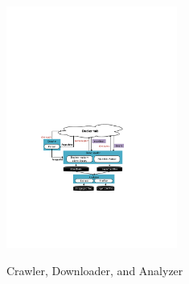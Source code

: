 
\begin{figure}
	\centering
	\includegraphics[width=0.5\textwidth]{graphs/fig-downloader-analyzer.pdf}\\
	\vspace{-6pt}
	\caption{Crawler, Downloader, and Analyzer
	}
	\label{fig-downloader-analyzer}
\end{figure}
